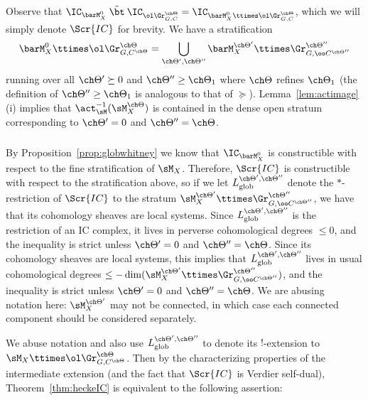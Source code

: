 Observe that $\IC_{\barM_X^0} \mathbin{\tilde\bt}
\IC_{\ol\Gr^{\ch\Theta}_{G,C}}
= \IC_{\barM^0_X \ttimes \ol\Gr^{\ch\Theta}_{G,C}}$, which we
will simply denote $\Scr{IC}$ for brevity.
We have a stratification
\[ \barM_X^0 \ttimes\ol\Gr^{\ch\Theta}_{G,C^{\ch\Theta}}
= \bigcup_{\ch\Theta',\ch\Theta''}
 \barM_X^{\ch\Theta'} \ttimes \Gr^{\ch\Theta''}_{G,\oo C^{\ch\Theta''}} \]
running over all $\ch\Theta' \succeq 0$
and $\ch\Theta'' \ge \ch\Theta_1$ where $\ch\Theta$ refines $\ch\Theta_1$ (the definition of $\ch\Theta'' \ge \ch\Theta_1$ is analogous to that of $\succeq$).
Lemma~\ref{lem:actimage}(i) implies that $\act_\sM^{-1}(\sM^{\ch\Theta}_X)$
is contained in the dense open stratum corresponding to
$\ch\Theta'=0$ and $\ch\Theta'' = \ch\Theta$.


\subsubsection{} \label{sect:ICglobineq}
By Proposition~\ref{prop:globwhitney} we know that
$\IC_{\barM_X^0}$ is constructible with respect to the fine stratification of
$\sM_X$. Therefore, $\Scr{IC}$ is constructible
with respect to the stratification above, so
if we let $L_{\mathrm{glob}}^{\ch\Theta', \ch\Theta''}$ denote
the $*$-restriction of $\Scr{IC}$ to the stratum
$\sM_X^{\ch\Theta'} \ttimes \Gr^{\ch\Theta''}_{G,\oo C^{\ch\Theta''}}$, we have that its cohomology sheaves are local systems.
Since $L^{\ch\Theta', \ch\Theta''}_{\mathrm{glob}}$ is the
restriction of an IC complex, it lives in perverse cohomological degrees
$\le 0$, and the inequality is strict unless $\ch\Theta'=0$ and $\ch\Theta''=\ch\Theta$.
Since its cohomology sheaves are local systems, this implies that
$L^{\ch\Theta', \ch\Theta''}_{\mathrm{glob}}$
lives in usual cohomological degrees
$\le -\dim( \sM_X^{\ch\Theta'} \ttimes \Gr^{\ch\Theta''}_{G,\oo C^{\ch\Theta''}})$, and the inequality is strict unless
$\ch\Theta'=0$ and $\ch\Theta''=\ch\Theta$.
We are abusing notation here: $\sM^{\ch\Theta'}_X$ may not be connected, in which case each connected component should be considered separately.



We abuse notation and also use $L^{\ch\Theta',\ch\Theta''}_{\mathrm{glob}}$
to denote its $!$-extension to $\sM_X \ttimes \ol\Gr^{\ch\Theta}_{G, C^{\ch\Theta}}$.
Then by the characterizing properties of the intermediate extension
(and the fact that $\Scr{IC}$ is Verdier self-dual),
Theorem~\ref{thm:heckeIC} is equivalent
to the following assertion:

